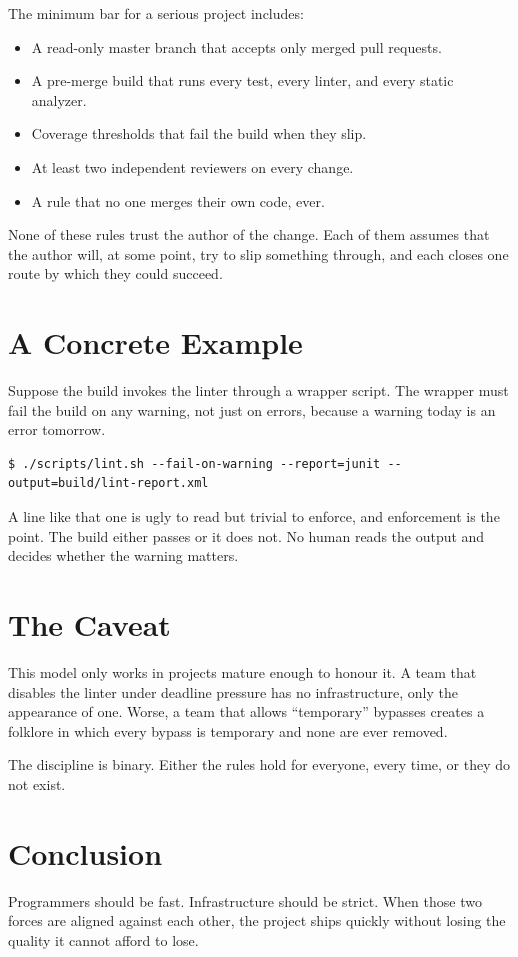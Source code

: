 \documentclass{article}
\begin{document}
The minimum bar for a serious project includes:

\begin{itemize}
  \item A read-only master branch that accepts only merged pull
    requests.
  \item A pre-merge build that runs every test, every linter, and
    every static analyzer.
  \item Coverage thresholds that fail the build when they slip.
  \item At least two independent reviewers on every change.
  \item A rule that no one merges their own code, ever.
\end{itemize}

None of these rules trust the author of the change.
Each of them assumes that the author will, at some point, try to
  slip something through, and each closes one route by which they
  could succeed.

\section{A Concrete Example}

Suppose the build invokes the linter through a wrapper script.
The wrapper must fail the build on any warning, not just on errors,
  because a warning today is an error tomorrow.

\begin{verbatim}
$ ./scripts/lint.sh --fail-on-warning --report=junit --output=build/lint-report.xml
\end{verbatim}

A line like that one is ugly to read but trivial to enforce, and
  enforcement is the point.
The build either passes or it does not.
No human reads the output and decides whether the warning matters.

\section{The Caveat}

This model only works in projects mature enough to honour it.
A team that disables the linter under deadline pressure has no
  infrastructure, only the appearance of one.
Worse, a team that allows ``temporary'' bypasses creates a folklore
  in which every bypass is temporary and none are ever removed.

The discipline is binary.
Either the rules hold for everyone, every time, or they do not
  exist.

\section{Conclusion}

Programmers should be fast.
Infrastructure should be strict.
When those two forces are aligned against each other, the project
  ships quickly without losing the quality it cannot afford to lose.
\end{document}
